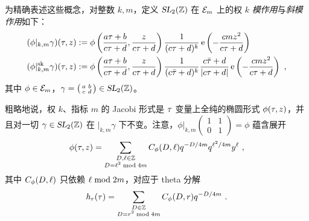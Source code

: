 
为精确表述这些概念，对整数 $k,m$，定义 $\operatorname{\textsl{SL}}_2(\mathbb{Z})$ 在 $\mathcal{E}_m$ 上的权 $k$ {\em 模作用}与{\em 斜模作用}如下：
\begin{gather}\label{def:Jac_skewJac}
\begin{split}
(\phi\lvert_{k,m}\gamma)(\tau,z) &:= 
\phi\left(\frac{a\tau+b}{c\tau+d},\frac{z}{c\tau+d}\right)
\frac1{(c\tau+d)^{{k}}} 
\operatorname{e}\left(- \frac{c mz^2}{c\tau+d}\right)
\\
(\phi\lvert^{\rm sk}_{k,m}\gamma )(\tau,z) &:= 
\phi\left(\frac{a\tau+b}{c\tau+d},\frac{z}{c\tau+d}\right)
\frac1{(c\bar{\tau}+d)^{{k}}}\frac{c\bar{\tau}+d}{|c\tau+d|}
\operatorname{e}\left(- \frac{c mz^2}{c\tau+d}\right)~,
\end{split}
\end{gather} 
其中 $\phi\in\mathcal{E}_m$，$\gamma=\left(\begin{smallmatrix} a&b\\c&d\end{smallmatrix}\right) \in \operatorname{\textsl{SL}}_2(\mathbb{Z})$。


粗略地说，权 $k$、指标 $m$ 的 Jacobi 形式是 $\tau$ 变量上全纯的椭圆形式 $\phi(\tau,z)$，并且对一切 $\gamma\in\operatorname{\textsl{SL}}_2(\mathbb{Z})$ 在 $\lvert_{k,m} \gamma$ 下不变。注意，${\phi|_{k,m}\left(\begin{smallmatrix}1&1\\0&1\end{smallmatrix}\right)=\phi}$ 蕴含展开
\begin{gather}\label{eqn:jac:hol-DFoucffhol}
\phi(\tau,z) = \sum_{\substack{D,\ell  \in \mathbb{Z}\\D=\ell ^2{\rm \;mod\;} 4m}} C_\phi(D,\ell ) q^{-D/4m}q^{\ell ^2/4m} y^\ell~,
\end{gather}
其中 $C_\phi(D,\ell ) $ 只依赖 $\ell {\rm \;mod\;} 2m$，对应于 theta 分解
\begin{gather}\label{eqn:jac:hol-thtcoeffFoucoeff}
h_r(\tau)=\sum_{\substack{D\in\mathbb{Z}\\D=r^2{\rm \;mod\;} 4m}}C_\phi(D,r)q^{-D/4m}~.
\end{gather}


